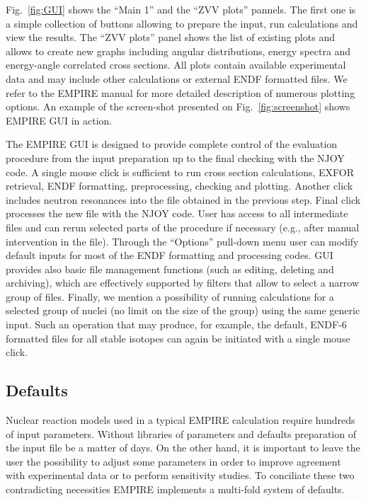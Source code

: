 \documentclass[twocolumn,amsmath,amssymb,10pt,groupedaddress,a4paper]{revtex4}
\begin{document}
Fig.~\ref{fig:GUI} shows the ``Main 1'' and the ``ZVV plots'' pannels. The first one is a simple collection of buttons allowing to prepare the input, run calculations and view the results. The ``ZVV plots'' panel shows the list of existing plots and allows to create new graphs including angular distributions, energy spectra and energy-angle correlated cross sections. All plots contain available experimental data and may include other calculations or external ENDF formatted files.  We refer to the EMPIRE manual for more detailed description of numerous plotting options. An example of the screen-shot presented on Fig.~\ref{fig:screenshot} shows EMPIRE GUI in action.

\begin{figure*}[htbp]
\caption{\label{fig:screenshot} Screen-shot of the EMPIRE GUI with a generated plot of cross sections for the inelastic scattering to the first 4 levels in $^{89}$Y. Note the capability of the interface to multiply results by a power of 10 to separate the curves.}
\end{figure*}


The EMPIRE GUI is designed to provide complete control of the evaluation procedure from the input preparation up to the final checking with the NJOY code. A single mouse click is sufficient to run cross section calculations, EXFOR retrieval, ENDF formatting, preprocessing, checking and plotting. Another click includes neutron resonances into the file obtained in the previous step. Final click processes the new file with the NJOY code. User has access to all intermediate files and can rerun selected parts of the procedure if necessary (e.g., after manual intervention in the file). Through the ``Options'' pull-down menu user can modify default inputs for most of the ENDF formatting and processing codes. GUI provides also basic file management  functions (such as editing, deleting and archiving), which are effectively supported by filters that allow to select a narrow group of files. Finally, we mention a possibility of running calculations for a selected group of nuclei (no limit on the size of the group) using the same generic input. Such an operation that may produce, for example, the default, ENDF-6 formatted files for all stable isotopes can again be initiated with a single mouse click.


\subsection{Defaults}
Nuclear reaction models used in a typical EMPIRE calculation require hundreds of input parameters. Without libraries of parameters and defaults preparation of the input file be a matter of days. On the other hand, it is important to leave the user the possibility to adjust some parameters in order to improve agreement with experimental data or to perform sensitivity studies. To conciliate these two contradicting necessities EMPIRE implements a multi-fold system of defaults.
\end{document}
